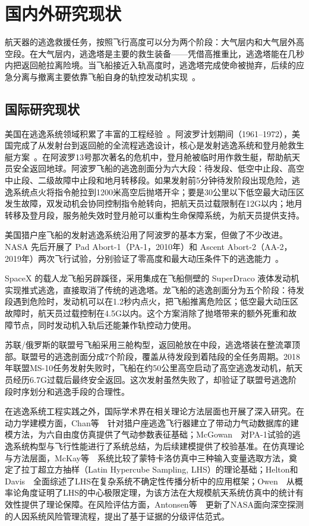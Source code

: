 \section{国内外研究现状}

航天器的逃逸救援任务，按照飞行高度可以分为两个阶段：大气层内和大气层外高空段。在大气层内，逃逸塔是主要的救生装备——凭借高推重比，逃逸塔能在几秒内把返回舱拉离险境。当飞船接近入轨高度时，逃逸塔完成使命被抛弃，后续的应急分离与撤离主要依靠飞船自身的轨控发动机实现~\cite{张智2004}。

\subsection{国际研究现状}

美国在逃逸系统领域积累了丰富的工程经验~\cite{王鹏程2023}。阿波罗计划期间（1961--1972），美国完成了从发射台到返回舱的全流程逃逸设计，核心是发射逃逸系统和登月舱救生艇方案~\cite{McCarthy1968}。在阿波罗13号那次著名的危机中，登月舱被临时用作救生艇，帮助航天员安全返回地球。阿波罗飞船的逃逸剖面分为六大段：待发段、低空中止段、高空中止段、二级故障中止段和地月转移段。如果发射前5分钟待发阶段出现危险，逃逸系统点火将指令舱拉到1200米高空后抛塔开伞；要是30公里以下低空最大动压区发生故障，双发动机会协同控制指令舱转向，把航天员过载限制在12G以内；地月转移及登月段，服务舱失效时登月舱可以重构生命保障系统，为航天员提供支持。

 美国猎户座飞船的发射逃逸系统沿用了阿波罗的基本方案，但做了不少改进。NASA 先后开展了 Pad Abort-1（PA-1，2010年）和 Ascent Abort-2（AA-2，2019年）两次飞行试验，分别验证了零高度和最大动压条件下的逃逸能力~\cite{McCauley2015,Litton2008,Proud2009,徐丹丹2018}。

 SpaceX 的载人龙飞船另辟蹊径，采用集成在飞船侧壁的 SuperDraco 液体发动机实现推式逃逸，直接取消了传统的逃逸塔。龙飞船的逃逸剖面分为五个阶段：待发段遇到危险时，发动机可以在1.2秒内点火，把飞船推离危险区；低空最大动压区故障时，航天员过载控制在4.5G以内。这个方案消除了抛塔带来的额外死重和故障节点，同时发动机入轨后还能兼作轨控动力使用。

苏联/俄罗斯的联盟号飞船采用三舱构型，返回舱放在中段，逃逸塔装在整流罩顶部。联盟号的逃逸剖面分成7个阶段，覆盖从待发段到着陆段的全任务周期。2018年联盟MS-10任务发射失败时，飞船在约50公里高空启动了高空逃逸发动机，航天员经历6.7G过载后最终安全返回。这次发射虽然失败了，却验证了联盟号逃逸阶段时序划分和逃逸手段的合理性。

在逃逸系统工程实践之外，国际学术界在相关理论方法层面也开展了深入研究。在动力学建模方面，Chan等~\cite{chan2011modeling}~针对猎户座逃逸飞行器建立了带动力气动数据库的建模方法，为六自由度仿真提供了气动参数表征基础；McGowan~\cite{mcgowan2011overview}~对PA-1试验的逃逸系统构型与飞行性能进行了系统总结，为后续建模提供了校验基准。在仿真理论与方法层面，McKay等~\cite{McKay1999}~系统比较了蒙特卡洛仿真中三种输入变量选取方法，奠定了拉丁超立方抽样（Latin Hypercube Sampling, LHS）的理论基础；Helton和Davis~\cite{helton2003latin}~全面综述了LHS在复杂系统不确定性传播分析中的应用框架；Owen~\cite{owen1992central}~从概率论角度证明了LHS的中心极限定理，为该方法在大规模航天系统仿真中的统计有效性提供了理论保障。在风险评估方面，Antonsen等~\cite{Antonsen2023}~更新了NASA面向深空探测的人因系统风险管理流程，提出了基于证据的分级评估范式。

